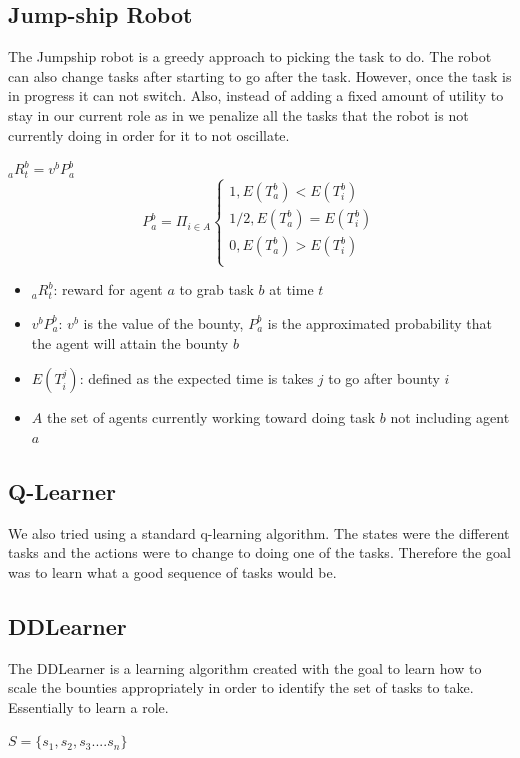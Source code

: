 \documentclass[twocolumn]{article}
\begin{document}
\subsection{Jump-ship Robot}
The Jumpship robot is a greedy approach to picking the task to do.  The robot can also change tasks after starting to go after the task.  However, once the task is in progress it can not switch.  Also, instead of adding a fixed amount of utility to stay in our current role as in \cite{Brusey2001} we penalize all the tasks that the robot is not currently doing in order for it to not oscillate.


$_aR_t^b = v^bP_a^b$
\[
P_a^b = \Pi_{i \in A} 
\begin{cases}
    1, E(T_a^b) <E(T_i^b)\\
    1/2, E(T_a^b) = E(T_i^b)\\
    0, E(T_a^b) >E(T_i^b)\\

\end{cases}
\]
\begin{itemize}
\item $_aR_t^b$: reward for agent $a$  to grab task $b$ at time $t$
\item $v^bP_a^b$: $v^b$ is the value of the bounty,  $P_a^b$ is the approximated probability that the agent will attain the bounty $b$ 
\item $E(T_i^j)$:  defined as the expected time is takes $j$ to go after bounty $i$
\item $A$ the set of agents currently working toward doing task $b$ not including agent $a$
\end{itemize}

\subsection{Q-Learner}
We also tried using a standard q-learning algorithm.  The states were the different tasks and the actions were to change to doing one of the tasks.  Therefore the goal was to learn what a good sequence of tasks would be.
\subsection{DDLearner}
The DDLearner is a learning algorithm created with the goal to learn how to scale the bounties appropriately in order to identify the set of tasks to take.  Essentially to learn a role.  


$S = \{s_1,s_2,s_3....s_n\}$
\end{document}
